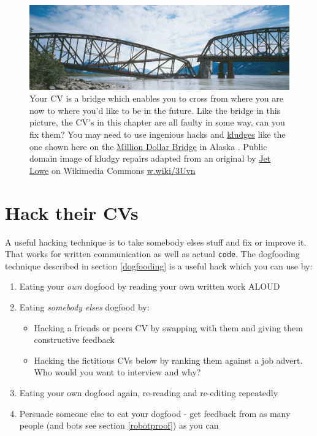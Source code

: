 \documentclass[
]{book}
\providecommand{\tightlist}{%
  \setlength{\itemsep}{0pt}\setlength{\parskip}{0pt}}
\begin{document}
\begin{figure}

{\centering \includegraphics[width=1\linewidth]{images/bridge-kludge-hack} 

}

\caption{Your CV is a bridge which enables you to cross from where you are now to where you'd like to be in the future. Like the bridge in this picture, the CV's in this chapter are all faulty in some way, can you fix them? You may need to use ingenious hacks and \href{https://en.wikipedia.org/wiki/Kludge}{kludges} like the one shown here on the \href{https://en.wikipedia.org/wiki/Miles_Glacier_Bridge}{Million Dollar Bridge} in Alaska . Public domain image of kludgy repairs adapted from an original by \href{https://en.wikipedia.org/wiki/Jet_Lowe}{Jet Lowe} on Wikimedia Commons \href{https://w.wiki/3Uvn}{w.wiki/3Uvn}}\label{fig:kludge-fig}
\end{figure}



\hypertarget{hack-their-cvs}{%
\section{Hack their CVs}\label{hack-their-cvs}}

A useful hacking technique is to take somebody elses stuff and fix or improve it. That works for written communication as well as actual \texttt{code}. The dogfooding technique described in section \ref{dogfooding} is a useful hack which you can use by:

\begin{enumerate}
\def\labelenumi{\arabic{enumi}.}
\tightlist
\item
  Eating your \emph{own} dogfood by reading your own written work ALOUD
\item
  Eating \emph{somebody elses} dogfood by:

  \begin{itemize}
  \tightlist
  \item
    Hacking a friends or peers CV by swapping with them and giving them constructive feedback
  \item
    Hacking the fictitious CVs below by ranking them against a job advert. Who would you want to interview and why?
  \end{itemize}
\item
  Eating your own dogfood again, re-reading and re-editing repeatedly
\item
  Persuade someone else to eat your dogfood - get feedback from as many people (and bots see section \ref{robotproof}) as you can
\end{enumerate}
\end{document}
